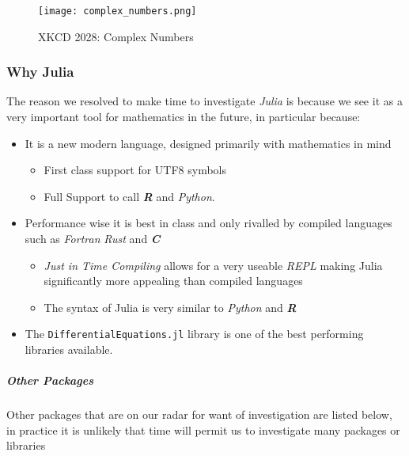 \documentclass[11pt]{article}
\begin{document}
\begin{figure}[htbp]
\centering
\texttt{[image: complex\_numbers.png]}
\caption{\label{xkcd-complex-numbers}XKCD 2028: Complex Numbers}
\end{figure}
\subsubsection{Why Julia}
\label{why-julia}
The reason we resolved to make time to investigate \emph{Julia} is because we see it as a very important tool for mathematics in the future, in particular because:

\begin{itemize}
\item It is a new modern language, designed primarily with mathematics in mind
\begin{itemize}
\item First class support for UTF8 symbols
\item Full Support to call \emph{\textbf{R}} and \emph{Python}.
\end{itemize}
\item Performance wise it is best in class and only rivalled by compiled languages such as \emph{Fortran} \emph{Rust} and \textbf{\emph{C}}
\begin{itemize}
\item \emph{Just in Time Compiling} allows for a very useable \emph{REPL} making Julia
significantly more appealing than compiled languages
\item The syntax of Julia is very similar to \emph{Python} and \emph{\textbf{R}}
\end{itemize}
\item The \texttt{DifferentialEquations.jl} library is one of the best performing libraries available.
\end{itemize}

\subparagraph{Other Packages}
\label{other-tools}
Other packages that are on our radar for want of investigation are listed below, in practice it is unlikely that time will permit us to investigate many packages or libraries
\end{document}
